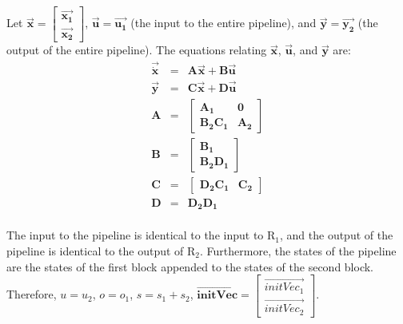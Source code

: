 Let $\vec{\mathbf{x}} = \left [ \begin{array} {c} \vec{\mathbf{x_1}} \\
\vec{\mathbf{x_2}} \end{array} \right ]$, $\vec{\mathbf{u}} =
\vec{\mathbf{u_1}}$ (the input to the entire pipeline), and
$\vec{\mathbf{y}} = \vec{\mathbf{y_2}}$ (the output of the entire
pipeline). The equations relating $\vec{\mathbf{x}}$,
$\vec{\mathbf{u}}$, and $\vec{\mathbf{y}}$ are:
\begin{eqnarray*}
\vec{\dot{\mathbf{x}}} & = & \mathbf{A}\vec{\mathbf{x}} + \mathbf{B}\vec{\mathbf{u}} \\
\vec{\mathbf{y}} & = & \mathbf{C}\vec{\mathbf{x}} + \mathbf{D}\vec{\mathbf{u}} \\
\mathbf{A} & = & \left [ \begin{array} {cc} \mathbf{A_1} &
\mathbf{0} \\ \mathbf{B_2}\mathbf{C_1} & \mathbf{A_2} \end{array} \right ] \\
\mathbf{B} & = & \left [ \begin{array} {c} \mathbf{B_1} \\ \mathbf{B_2}\mathbf{D_1} \end{array} \right ] \\
\mathbf{C} & = & \left [ \begin{array} {cc} \mathbf{D_2}\mathbf{C_1} & \mathbf{C_2} \end{array} \right ] \\
\mathbf{D} & = & \mathbf{D_2}\mathbf{D_1} \\
\end{eqnarray*}

    The input to the pipeline is identical to the input to $\mathrm{R_1}$,
and the output of the pipeline is identical to the output of
$\mathrm{R_2}$. Furthermore, the states of the pipeline are the
states of the first block appended to the states of the second
block. Therefore, $u = u_2$, $o = o_1$, $s = s_1 + s_2$,
$\overrightarrow{\mathbf{initVec}} = \left [ \begin{array} {c}
\overrightarrow{initVec_1} \\ \overrightarrow{initVec_2}
\end{array} \right ]$.

